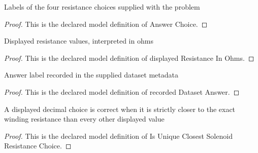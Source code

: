 \begin{definition}
  \label{def:physics:phyx-mini-0988:phyxminiproblems-problemphyxmini0988-answerchoice}
  Labels of the four resistance choices supplied with the problem
\end{definition}
\begin{proof}
  This is the declared model definition of Answer Choice.
\end{proof}
\begin{definition}
  \label{def:physics:phyx-mini-0988:phyxminiproblems-problemphyxmini0988-answerchoice-displayedresistanceinohms}
  Displayed resistance values, interpreted in ohms
\end{definition}
\begin{proof}
  This is the declared model definition of displayed Resistance In Ohms.
\end{proof}
\begin{definition}
  \label{def:physics:phyx-mini-0988:phyxminiproblems-problemphyxmini0988-recordeddatasetanswer}
  Answer label recorded in the supplied dataset metadata
\end{definition}
\begin{proof}
  This is the declared model definition of recorded Dataset Answer.
\end{proof}
\begin{definition}
  \label{def:physics:phyx-mini-0988:phyxminiproblems-problemphyxmini0988-isuniqueclosestsolenoidresistancechoice}
  A displayed decimal choice is correct when it is strictly closer to the exact winding resistance than every other displayed value
\end{definition}
\begin{proof}
  This is the declared model definition of Is Unique Closest Solenoid Resistance Choice.
\end{proof}
